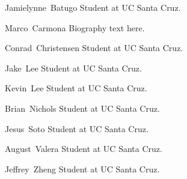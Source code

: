 \documentclass[journal,compsoc]{IEEEtran}
\begin{document}
\begin{IEEEbiography}{Jamielynne~Batugo}
  Student at UC Santa Cruz.
\end{IEEEbiography}

\begin{IEEEbiography}{Marco~Carmona}
  Biography text here.
\end{IEEEbiography}

\begin{IEEEbiography}{Conrad~Christensen}
  Student at UC Santa Cruz.
\end{IEEEbiography}

\begin{IEEEbiography}{Jake~Lee}
  Student at UC Santa Cruz.
\end{IEEEbiography}

\begin{IEEEbiography}{Kevin~Lee}
  Student at UC Santa Cruz.
\end{IEEEbiography}

\begin{IEEEbiography}{Brian~Nichols}
  Student at UC Santa Cruz.
\end{IEEEbiography}

\begin{IEEEbiography}{Jesus~Soto}
  Student at UC Santa Cruz.
\end{IEEEbiography}

\begin{IEEEbiography}{August~Valera}
  Student at UC Santa Cruz.
\end{IEEEbiography}

\begin{IEEEbiography}{Jeffrey~Zheng}
  Student at UC Santa Cruz.
\end{IEEEbiography}






\end{document}

